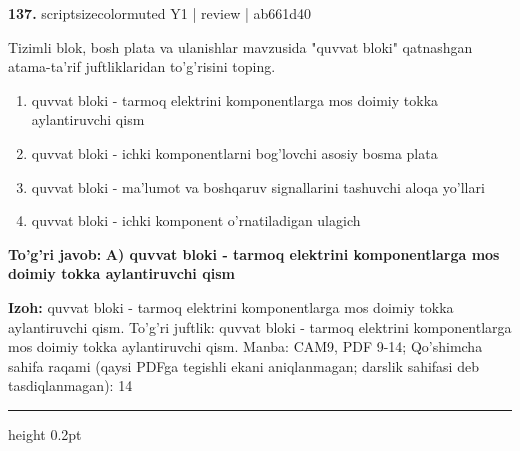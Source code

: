 \documentclass[10pt,a4paper]{article}
\begin{document}
{\bfseries\sffamily\color{ink} 137.} {scriptsizecolor{muted} Y1 | review | ab661d40}
\par
Tizimli blok, bosh plata va ulanishlar mavzusida "quvvat bloki" qatnashgan atama-ta'rif juftliklaridan to'g'risini toping.
\begin{enumerate}[label=\Alph*),leftmargin=9mm]
\item quvvat bloki - tarmoq elektrini komponentlarga mos doimiy tokka aylantiruvchi qism
\item quvvat bloki - ichki komponentlarni bog'lovchi asosiy bosma plata
\item quvvat bloki - ma'lumot va boshqaruv signallarini tashuvchi aloqa yo'llari
\item quvvat bloki - ichki komponent o'rnatiladigan ulagich
\end{enumerate}
\begin{tcolorbox}[enhanced,breakable,colback=teal!4,colframe=teal!60!black,boxrule=0.45pt,arc=1.2mm,left=2.7mm,right=2.7mm,top=1.8mm,bottom=1.8mm,before skip=2mm,after skip=2mm]
{\bfseries\sffamily\color{teal}To'g'ri javob:} \textbf{A) quvvat bloki - tarmoq elektrini komponentlarga mos doimiy tokka aylantiruvchi qism}
\par\smallskip
{\bfseries Izoh:} quvvat bloki - tarmoq elektrini komponentlarga mos doimiy tokka aylantiruvchi qism. To'g'ri juftlik: quvvat bloki - tarmoq elektrini komponentlarga mos doimiy tokka aylantiruvchi qism. Manba: CAM9, PDF 9-14; Qo'shimcha sahifa raqami (qaysi PDFga tegishli ekani aniqlanmagan; darslik sahifasi deb tasdiqlanmagan): 14
\end{tcolorbox}
\vspace{2mm}\hrule height 0.2pt\vspace{3mm}
\end{document}
